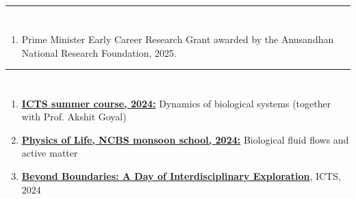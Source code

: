 \documentclass[10pt]{res} %
\begin{document}
\begin{resume}
\vspace*{-2mm}

\noindent\rule{\textwidth}{0.6pt}
\vspace*{-10mm}
\section{}
\vspace*{6mm}
\begin{enumerate}
	\item Prime Minister Early Career Research Grant awarded by the Anusandhan National Research Foundation, 2025.
\end{enumerate}


\vspace*{-2mm}

\noindent\rule{\textwidth}{0.6pt}
\vspace*{-10mm}
\section{}
\vspace*{6mm}
\begin{enumerate}
	\item \href{https://www.icts.res.in/lectures/sc-2024}{\textbf{ICTS summer course, 2024:}} Dynamics of biological systems (together with Prof. Akshit Goyal)
	
	\item \href{https://www.ncbs.res.in/events/physics-of-life-2024-9th-annual-monsoon-school}{\textbf{Physics of Life, NCBS monsoon school, 2024:}} Biological fluid flows and active matter
	
	\item \href{https://www.icts.res.in/outreach/other-events/BB2024}{\textbf{Beyond Boundaries: A Day of Interdisciplinary Exploration}}, ICTS, 2024
\end{enumerate}




\end{resume}
\end{document}

